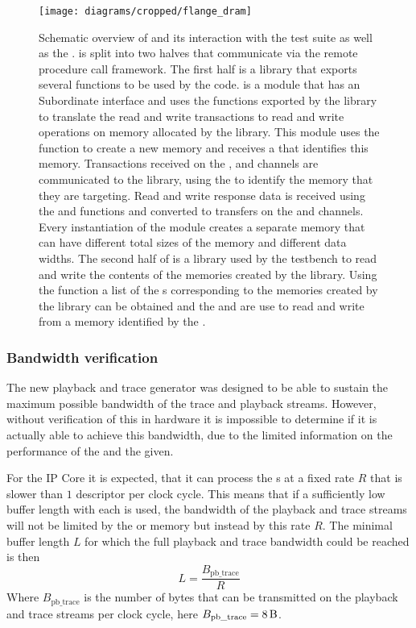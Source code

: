 \begin{figure}[htbp]
\centerline{\texttt{[image: diagrams/cropped/flange\_dram]}}
\caption{Schematic overview of \flangedram{} and its interaction with the \cpp{} test suite as well as the \systemverilog{} \DUT{}. \flangedram{} is split into two halves that communicate via the \RCF{} remote procedure call framework. The first half is a \DPI{} library that exports several functions to be used by the \systemverilog{} code.  is a \systemverilog{} module that has an \AXI{} Subordinate interface and uses the functions exported by the \flangedram{} \DPI{} library to translate the \AXI{} read and write transactions to read and write operations on memory allocated by the \flangedram{} library. This module uses the  function to create a new memory and receives a  that identifies this memory. Transactions received on the \AW{}, \AR{} and \W{} \AXI{} channels are communicated to the \DPI{} library, using the  to identify the memory that they are targeting. Read and write response data is received using the  and  functions and converted to transfers on the \R{} and \B{} channels. Every instantiation of the  module creates a separate memory that can have different total sizes of the memory and different \AXI{} data widths.
The second half of \flangedram{} is a library used by the \cpp{} testbench to read and write the contents of the memories created by the \DPI{} library. Using the  function a list of the s corresponding to the memories created by the \DPI{} library can be obtained and the  and  are use to read and write from a memory identified by the .  }\label{dia:flange-dram-overview}
\end{figure}

\subsubsection{Bandwidth verification}\label{sec:pb_trace_verif}
The new playback and trace generator was designed to be able to sustain the maximum possible bandwidth of the trace and playback streams. However, without verification of this in hardware it is impossible to determine if it is actually able to achieve this bandwidth, due to the limited information on the performance of the \AXIDMA{} and the \XilinxMIG{} given.

For the \AXIDMA{} IP Core it is expected, that it can process the \descriptor{}s at a fixed rate $R$ that is slower than $1$ descriptor per clock cycle. This means that if a sufficiently low buffer length with each \descriptor{} is used, the bandwidth of the playback and trace streams will not be limited by the \XilinxMIG{} or \DDR{} memory but instead by this rate $R$.
The minimal buffer length $L$ for which the full playback and trace bandwidth could be reached is then
\[L = \frac{B_{\text{pb\_trace}}}{R}\]
Where $B_{\text{pb\_trace}}$ is the number of bytes that can be transmitted on the playback and trace streams per clock cycle, here $B_{\text{pb\_trace}} = \SI{8}{\byte}$.


